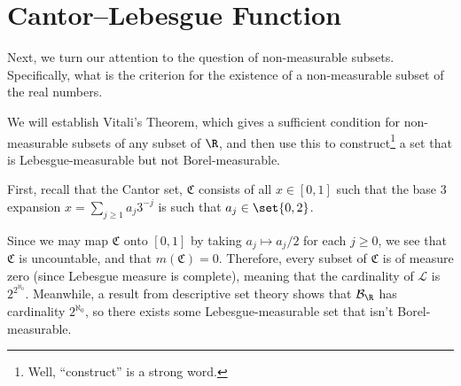 \documentclass[10pt]{mypackage}
\begin{document}
\section{Cantor--Lebesgue Function}%
Next, we turn our attention to the question of non-measurable subsets. Specifically, what is the criterion for the existence of a non-measurable subset of the real numbers.\newline

We will establish Vitali's Theorem, which gives a sufficient condition for non-measurable subsets of any subset of $\R$, and then use this to construct\footnote{Well, ``construct'' is a strong word.} a set that is Lebesgue-measurable but not Borel-measurable.\newline

First, recall that the Cantor set, $\mathfrak{C}$ consists of all $x\in [0,1]$ such that the base 3 expansion $x = \sum_{j\geq 1}a_j3^{-j}$ is such that $a_j \in \set{0,2}$.\newline

Since we may map $\mathfrak{C}$ onto $[0,1]$ by taking $a_j \mapsto a_j/2$ for each $j\geq 0$, we see that $\mathfrak{C}$ is uncountable, and that $m(\mathfrak{C}) = 0$. Therefore, every subset of $\mathfrak{C}$ is of measure zero (since Lebesgue measure is complete), meaning that the cardinality of $\mathcal{L}$ is $2^{2^{\aleph_0}}$. Meanwhile, a result from descriptive set theory shows that $\mathcal{B}_{\R}$ has cardinality $2^{\aleph_0}$, so there exists some Lebesgue-measurable set that isn't Borel-measurable.\newline
\end{document}
